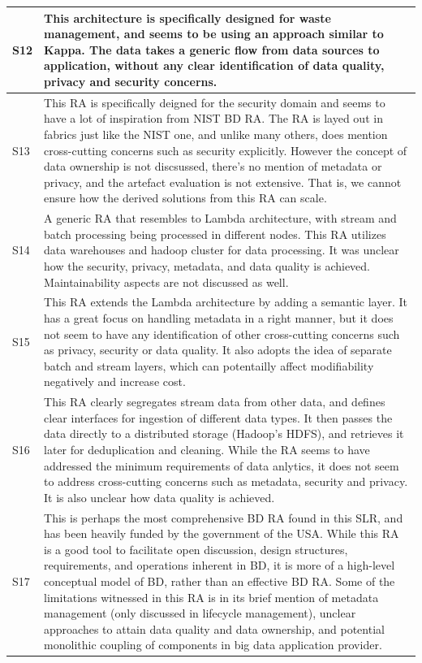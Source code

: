 \documentclass[review]{elsarticle}
\begin{document}
\begin{longtable}{|p{0.5cm}|p{11cm}|}
        \hline
        S12 & This architecture is specifically designed for waste management, and seems to be using an approach similar to Kappa. The data takes a generic flow from data sources to application, without any clear identification of data quality, privacy and security concerns.    \\
        \hline
        S13 & This RA is specifically deigned for the security domain and seems to have a lot of inspiration from NIST BD RA. The RA is layed out in fabrics just like the NIST one, and unlike many others, does mention cross-cutting concerns such as security explicitly. However the concept of data ownership is not discsussed, there's no mention of metadata or privacy, and the artefact evaluation is not extensive. That is, we cannot ensure how the derived solutions from this RA can scale.    \\
        \hline
        S14 & A generic RA that resembles to Lambda architecture, with stream and batch processing being processed in different nodes. This RA utilizes data warehouses and hadoop cluster for data processing. It was unclear how the security, privacy, metadata, and data quality is achieved. Maintainability aspects are not discussed as well. \\
        \hline
        S15 & This RA extends the Lambda architecture by adding a semantic layer. It has a great focus on handling metadata in a right manner, but it does not seem to have any identification of other cross-cutting concerns such as privacy, security or data quality. It also adopts the idea of separate batch and stream layers, which can potentailly affect modifiability negatively and increase cost. \\
        \hline
        S16 & This RA clearly segregates stream data from other data, and defines clear interfaces for ingestion of different data types. It then passes the data directly to a distributed storage (Hadoop's HDFS), and retrieves it later for deduplication and cleaning. While the RA seems to have addressed the minimum requirements of data anlytics, it does not seem to address cross-cutting concerns such as metadata, security and privacy. It is also unclear how data quality is achieved. \\
        \hline
        S17 & This is perhaps the most comprehensive BD RA found in this SLR, and has been heavily funded by the government of the USA. While this RA is a good tool to facilitate open discussion, design structures, requirements, and operations inherent in BD, it is more of a high-level conceptual model of BD, rather than an effective BD RA. Some of the limitations witnessed in this RA is in its brief mention of metadata management (only discussed in lifecycle management), unclear approaches to attain data quality and data ownership, and potential monolithic coupling of components in big data application provider. \\

\end{longtable}
\end{document}
